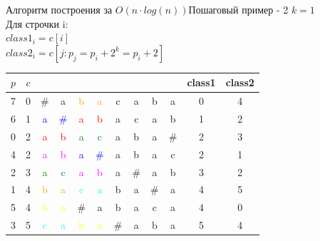 \documentclass[10pt]{beamer}
\begin{document}
\begin{frame}[fragile]{Алгоритм построения за $O(n \cdot log(n))$}{Пошаговый пример - 2}
$k = 1$\\
Для строчки i: \\
$class1_i = c[i]$ \\
$class2_i = c[j: p_j=p_i+2^k=p_i+2]$ \\
\begin{center}
\begin{tabular}{ c|c|cccccccc|c|c } 
 $p$ & $c$ & & & & & & & & & class1 & class2 \\ 
  \hline
 7 & 0 & \# & a & \textcolor{orange}{b} & \textcolor{orange}{a} & c & a & b & a & 0 & 4 \\ 
  \hline
 6 & 1 & \textcolor{blue}{a} & \textcolor{blue}{\#} & \textcolor{red}{a} & \textcolor{red}{b} & a & c & a & b & 1 & 2 \\ 
 \hline
 0 & 2 & \textcolor{red}{a} & \textcolor{red}{b} & \textcolor{green}{a} & \textcolor{green}{c} & a & b & a & \# & 2 & 3 \\ 
  \hline
 4 & 2 & \textcolor{magenta}{a} & \textcolor{magenta}{b} & \textcolor{blue}{a} & \textcolor{blue}{\#} & a & b & a & c & 2 & 1 \\ 
 \hline
 2 & 3 & \textcolor{green}{a} & \textcolor{green}{c} & \textcolor{magenta}{a} & \textcolor{magenta}{b} & a & \# & a & b & 3 & 2 \\ 
 \hline
 1 & 4 & \textcolor{orange}{b} & \textcolor{orange}{a} & \textcolor{cyan}{c} & \textcolor{cyan}{a} & b & a & \# & a & 4 & 5 \\ 
 \hline
 5 & 4 & \textcolor{yellow}{b} & \textcolor{yellow}{a} & \# & a & b & a & c & a & 4 & 0 \\ 
 \hline
 3 & 5 & \textcolor{cyan}{c} & \textcolor{cyan}{a} & \textcolor{yellow}{b} & \textcolor{yellow}{a} & \# & a & b & a & 5 & 4 \\ 
\end{tabular}
\end{center}
\end{frame}
\end{document}
